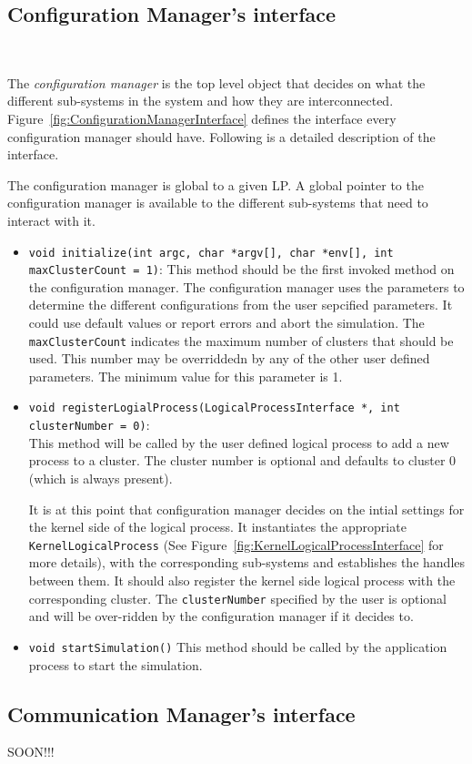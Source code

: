 \subsection{Configuration Manager's interface}

\begin{figure*}
\begin{center}
  \ 
\end{center}
\caption{A Configuration Manager's
  interface.}\label{fig:ConfigurationManagerInterface}
\end{figure*}

The \emph{configuration manager} is the top level object that decides on
what the different sub-systems in the system and how they are
interconnected. Figure~\ref{fig:ConfigurationManagerInterface} defines the
interface every configuration manager should have. Following is a detailed
description of the interface.

The configuration manager is global to a given LP. A global pointer to the 
configuration manager is available to the different sub-systems that need
to interact with it.

\begin{itemize}
\item {\tt void initialize(int argc, char *argv[], char *env[], int\\
    maxClusterCount = 1)}: This method should be the first invoked method
  on the configuration manager. The configuration manager uses the
  parameters to determine the different configurations from the user
  sepcified parameters. It could use default values or report errors and
  abort the simulation. The {\tt maxClusterCount} indicates the maximum
  number of clusters that should be used. This number may be overriddedn
  by any of the other user defined parameters. The minimum value for this
  parameter is 1.

\item {\tt void registerLogialProcess(LogicalProcessInterface *, int
    clusterNumber = 0)}:\\ This method will be called by the user defined
  logical process to add a new process to a cluster. The cluster number is
  optional and defaults to cluster 0 (which is always present).

  It is at this point that configuration manager decides on the intial
  settings for the kernel side of the logical process. It instantiates the
  appropriate {\tt KernelLogicalProcess} (See
  Figure~\ref{fig:KernelLogicalProcessInterface} for more details), with
  the corresponding sub-systems and establishes the handles between them.
  It should also register the kernel side logical process with the
  corresponding cluster. The {\tt clusterNumber} specified by the user is
  optional and will be over-ridden by the configuration manager if it
  decides to.

\item {\tt void startSimulation()} This method should be called by the
  application process to start the simulation.
\end{itemize}

\subsection{Communication Manager's interface}

  SOON!!!





